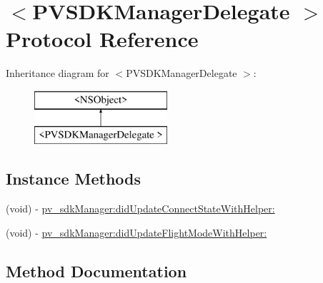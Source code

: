 \hypertarget{protocol_p_v_s_d_k_manager_delegate_01-p}{}\section{$<$P\+V\+S\+D\+K\+Manager\+Delegate $>$ Protocol Reference}
\label{protocol_p_v_s_d_k_manager_delegate_01-p}
Inheritance diagram for $<$P\+V\+S\+D\+K\+Manager\+Delegate $>$\+:\begin{figure}[H]
\begin{center}
\leavevmode
\includegraphics[height=2.000000cm]{protocol_p_v_s_d_k_manager_delegate_01-p}
\end{center}
\end{figure}
\subsection*{Instance Methods}
\begin{DoxyCompactItemize}
\item 
(void) -\/ \hyperlink{protocol_p_v_s_d_k_manager_delegate_01-p_af33c6d3f558fe974b1e2855b5aa8d623}{pv\+\_\+sdk\+Manager\+:did\+Update\+Connect\+State\+With\+Helper\+:}
\item 
(void) -\/ \hyperlink{protocol_p_v_s_d_k_manager_delegate_01-p_aa368c839d7e0cac83177e5d8298d89b3}{pv\+\_\+sdk\+Manager\+:did\+Update\+Flight\+Mode\+With\+Helper\+:}
\end{DoxyCompactItemize}


\subsection{Method Documentation}
\mbox{\label{protocol_p_v_s_d_k_manager_delegate_01-p_af33c6d3f558fe974b1e2855b5aa8d623}} 
